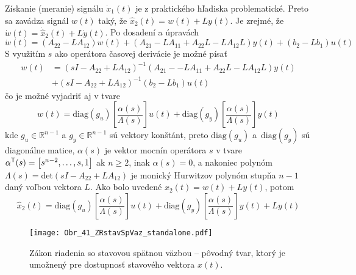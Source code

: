 \documentclass[a4paper, 10pt, ]{article}
\begin{document}
Získanie (meranie) signálu $\dot{x}_1(t)$ je z praktického hľadiska problematické. Preto sa zavádza signál $w(t)$ taký, že $\hat{x}_2(t) = w(t) + L y(t)$. Je zrejmé, že~$\dot{w}(t) = \dot{\hat{x}}_2(t) + L \dot{y}(t)$. Po dosadení a úpravách
\begin{equation}
	\dot{w}(t) =
	\left( A_{22} - L A_{12} \right) w(t)
	 +
	\left( A_{21} - L A_{11} + A_{22} L - L A_{12} L \right) y(t)
	 +
	\left( b_2 - L b_1 \right) u(t)
\end{equation}
S využitím $s$ ako operátora časovej derivácie je možné písať
\begin{equation}
	\begin{split}
		w(t)& =
			\left( sI - A_{22} + L A_{12} \right)^{-1}
			\left( A_{21} -  \right.   \left. - L A_{11} + A_{22} L - L A_{12} L \right) y(t)
						\\ & +
			\left( sI - A_{22} + L A_{12} \right)^{-1}
			\left( b_2 - L b_1 \right) u(t)
	\end{split}
\end{equation}
čo je možné vyjadriť aj v tvare
\begin{equation}
	w(t) =
	\text{diag}(g_u) \left[ \frac{\alpha(s)}{\Lambda(s)} \right] u(t)
	+
	\text{diag}(g_y) \left[ \frac{\alpha(s)}{\Lambda(s)} \right] y(t)
\end{equation}
kde $g_u \in \mathbb{R}^{n-1}$ a $g_y \in \mathbb{R}^{n-1}$ sú  vektory konštánt, preto $\text{diag}(g_u)$ a~$\text{diag}(g_y)$ sú diagonálne matice, $\alpha(s)$ je vektor mocnín operátora $s$ v tvare $\alpha^{\mathsf{T}}(s) = \begin{bmatrix} s^{n-2}, \ldots,s, 1 \end{bmatrix}$ ak $n\geq 2$, inak $\alpha(s) = 0$, a nakoniec polynóm $\Lambda(s) = \text{det}\left( sI - A_{22} + L A_{12} \right)$ je monický Hurwitzov polynóm stupňa $n-1$ daný voľbou vektora $L$. Ako bolo uvedené $\hat{x}_2(t) = w(t) + L y(t)$, potom
\begin{equation}
	\hat{x}_2(t) =
	\text{diag}(g_u) \left[ \frac{\alpha(s)}{\Lambda(s)} \right] u(t)
	+
	\text{diag}(g_y) \left[ \frac{\alpha(s)}{\Lambda(s)} \right] y(t)
	+ L y(t)
\end{equation}





\begin{figure}[t]
    \centering
    \texttt{[image: Obr\_41\_ZRstavSpVaz\_standalone.pdf]}
    \caption{Zákon riadenia so stavovou spätnou väzbou -- pôvodný tvar, ktorý je umožnený pre dostupnosť stavového vektora $x(t)$.}
    \label{Obr_41_ZRstavSpVaz}
\end{figure}
\end{document}
